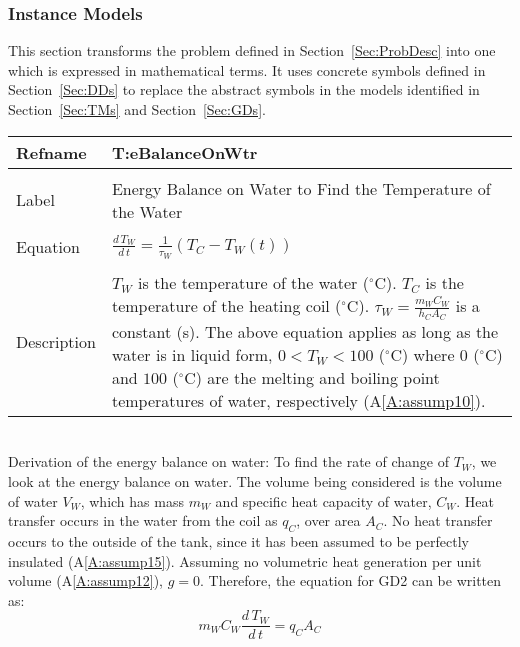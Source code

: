 \documentclass[12pt]{article}
\begin{document}
\subsubsection{Instance Models}
\label{Sec:IMs}
This section transforms the problem defined in Section~\ref{Sec:ProbDesc} into one which is expressed in mathematical terms. It uses concrete symbols defined in Section~\ref{Sec:DDs} to replace the abstract symbols in the models identified in Section~\ref{Sec:TMs} and Section~\ref{Sec:GDs}.
~\newline
\noindent \begin{minipage}{\textwidth}
\begin{tabular}{p{} p{}}
\toprule \textbf{Refname} & \textbf{T:eBalanceOnWtr}
\label{T:eBalanceOnWtr}
\\ \midrule \\
Label & Energy Balance on Water to Find the Temperature of the Water
\\ \midrule \\
Equation & $\frac{d\,{T_{W}}}{d\,t}=\frac{1}{{\tau{}_{W}}} \left({T_{C}}-{T_{W}}\left(t\right)\right)$
\\ \midrule \\
Description & ${T_{W}}$ is the temperature of the water (${}^{\circ}$C). ${T_{C}}$ is the temperature of the heating coil (${}^{\circ}$C). ${\tau{}_{W}}=\frac{{m_{W}} {C_{W}}}{{h_{C}} {A_{C}}}$ is a constant (s). The above equation applies as long as the water is in liquid form, $0<{T_{W}}<100$ (${}^{\circ}$C) where $0$ (${}^{\circ}$C) and $100$ (${}^{\circ}$C) are the melting and boiling point temperatures of water, respectively (A\ref{A:assump10}).
\\ \bottomrule \end{tabular}
\end{minipage}\\
Derivation of the energy balance on water:
To find the rate of change of ${T_{W}}$, we look at the energy balance on water. The volume being considered is the volume of water ${V_{W}}$, which has mass ${m_{W}}$ and specific heat capacity of water, ${C_{W}}$. Heat transfer occurs in the water from the coil as ${q_{C}}$, over area ${A_{C}}$. No heat transfer occurs to the outside of the tank, since it has been assumed to be perfectly insulated (A\ref{A:assump15}). Assuming no volumetric heat generation per unit volume (A\ref{A:assump12}), $g=0$. Therefore, the equation for GD2 can be written as:
\begin{dmath}
{m_{W}} {C_{W}} \frac{d\,{T_{W}}}{d\,t}={q_{C}} {A_{C}}
\end{dmath}
\end{document}
